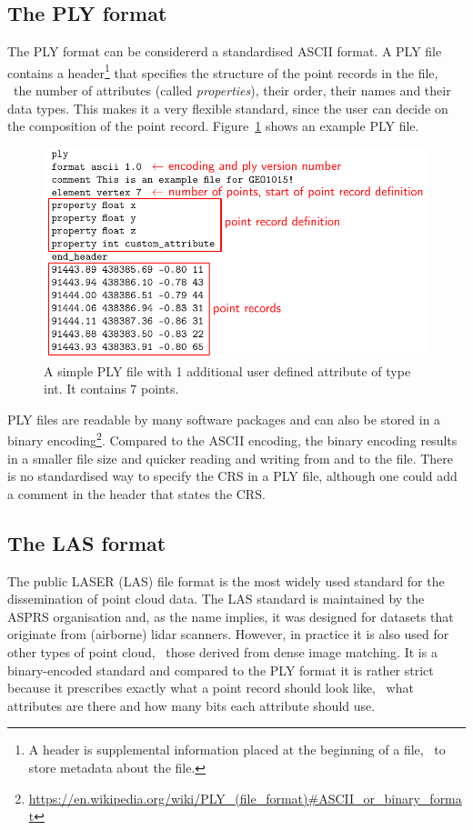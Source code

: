 \subsection{The PLY format}
The PLY format can be considererd a standardised ASCII format.
A PLY file contains a header\footnote{A header is supplemental information placed at the beginning of a file, \eg\ to store metadata about the file.} that specifies the structure of the point records in the file, \ie\ the number of attributes (called \emph{properties}), their order, their names and their data types.
This makes it a very flexible standard, since the user can decide on the composition of the point record.
Figure~\ref{fig:ply} shows an example PLY file.
\begin{figure}
  \includegraphics[width=\linewidth]{figs/ply_header.pdf}
  \caption{A simple PLY file with 1 additional user defined attribute of type int. It contains 7 points.}
  \label{fig:ply}
\end{figure}


PLY files are readable by many software packages and can also be stored in a binary encoding\footnote{\url{https://en.wikipedia.org/wiki/PLY_(file_format)\#ASCII_or_binary_format}}.
Compared to the ASCII encoding, the binary encoding results in a smaller file size and quicker reading and writing from and to the file.
There is no standardised way to specify the CRS in a PLY file, although one could add a comment in the header that states the CRS.

\subsection{The LAS format}
The public LASER (LAS) file format is the most widely used standard for the dissemination of point cloud data.
The LAS standard is maintained by the ASPRS organisation and, as the name implies, it was designed for datasets that originate from (airborne) lidar scanners.
However, in practice it is also used for other types of point cloud, \eg\ those derived from dense image matching.
It is a binary-encoded standard and compared to the PLY format it is rather strict because it prescribes exactly what a point record should look like, \ie\ what attributes are there and how many bits each attribute should use. 

